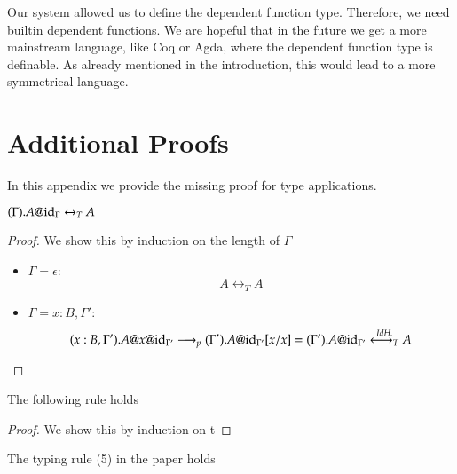 \documentclass[a4paper,cleardoubleempty,BCOR1cm]{scrbook}
\begin{document}
Our system allowed us to define the dependent function type. Therefore, we
need builtin dependent functions. We are hopeful that in the future we get a
more mainstream language, like Coq or Agda, where the dependent function type
is definable. As already mentioned in the introduction, this would lead to a
more symmetrical language.

\appendix

\chapter{Additional Proofs}
\label{sec:orgff507b7}

In this appendix we provide the missing proof for type applications.
\begin{lemma}
\((\Gamma).A@\id{\Gamma}\leftrightarrow_T A\)
\label{abstrid}
\end{lemma}
\begin{proof}
We show this by induction on the length of \(\Gamma\)
\begin{itemize}
\item \(\Gamma=\epsilon\):
\begin{equation*}
   A \longleftrightarrow_T A
\end{equation*}
\item \(\Gamma=x:B,\Gamma'\):
\begin{equation*}
  (x:B,\Gamma').A@x@\id{\Gamma'}
  \longrightarrow_p(\Gamma').A@\id{\Gamma'}[x/x]
  = (\Gamma').A@\id{\Gamma'} \overset{IdH.}{\longleftrightarrow_T}A
\end{equation*}
\end{itemize}
\end{proof}
\begin{lemma}
The following rule holds
\begin{prooftree}
\end{prooftree}
\label{ctxconv}
\end{lemma}
\begin{proof}
We show this by induction on t
\end{proof}
\begin{theorem}
The typing rule (5) in the paper holds
\begin{prooftree}
\end{prooftree}
\end{theorem}
\end{document}
